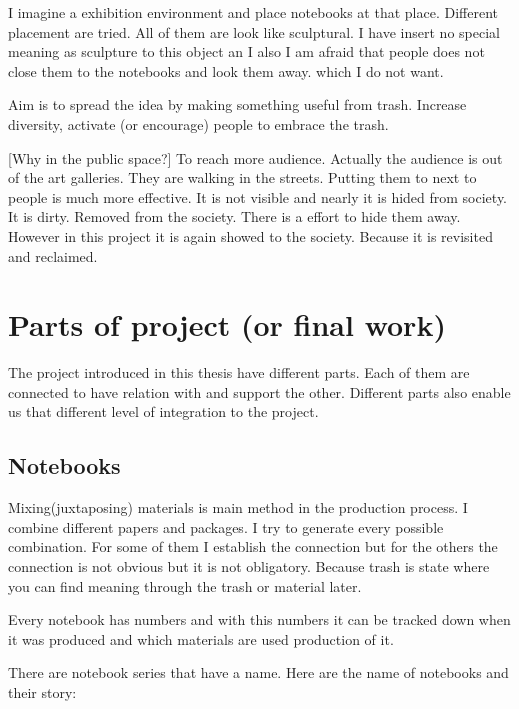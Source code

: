 
I imagine a exhibition environment and place notebooks at that place. Different placement are tried. All of them are look like sculptural. I have insert no special meaning as sculpture to this object an I also I am afraid that people does not close them to the notebooks and look them away. which I do not want. 

Aim is to spread the idea by making something useful from trash. Increase diversity, activate (or encourage) people to embrace the trash.

[Why in the public space?] To reach more audience. Actually the audience is out of the art galleries. They are walking in the streets. Putting them to next to people is much more effective. It is not visible and nearly it is hided from society. It is dirty. Removed from the society. There is a effort to hide them away. However in this project it is again showed to the society. Because it is revisited and reclaimed. 





%
%
\section{Parts of project (or final work)}
The project introduced in this thesis have different parts. Each of them are connected to have relation with and support the other. Different parts also enable us that different level of integration to the project. 





%
%
\subsection{Notebooks}
Mixing(juxtaposing) materials is main method in the production process. I combine different papers and packages. I try to generate every possible combination. For some of them I establish the connection but for the others the connection is not obvious but it is not obligatory. Because trash is state where you can find meaning through the trash or material later. 

Every notebook has numbers and with this numbers it can be tracked down when it was produced and which materials are used production of it.

There are notebook series that have a name. Here are the name of notebooks and their story:

